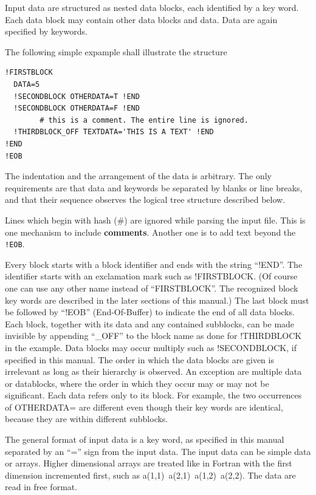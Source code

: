 \documentclass[final,12pt]{article}
\begin{document}
Input data are structured as nested data blocks, each identified
by a key word. Each data block may contain other data blocks and
data. Data are again specified by keywords.

The following simple expample shall illustrate the structure 
\begin{verbatim}
!FIRSTBLOCK
  DATA=5
  !SECONDBLOCK OTHERDATA=T !END
  !SECONDBLOCK OTHERDATA=F !END
        # this is a comment. The entire line is ignored.
  !THIRDBLOCK_OFF TEXTDATA='THIS IS A TEXT' !END
!END
!EOB
\end{verbatim}
The indentation and the arrangement of the data is arbitrary. The only
requirements are that data and keywords be separated by blanks or
line breaks, and that their sequence observes the logical tree structure
described below.

Lines which begin with hash ($\#$) are ignored while parsing the input
file. This is one mechanism to include
\textbf{comments}. Another one is to add
text beyond the \verb|!EOB|.

Every block starts with a block identifier and ends with the string
``!END''.  The identifier starts with an exclamation mark such as
!FIRSTBLOCK. (Of course one can use any other name instead of
``FIRSTBLOCK''. The recognized block key words are described in the
later sections of this manual.) The last block must be followed by
``!EOB'' (End-Of-Buffer) to indicate the end of all data blocks. Each
block, together with its data and any contained subblocks, can be
made invisible by appending ``\_OFF'' to the block name as done for
!THIRDBLOCK in the example. Data blocks may occur multiply such as
!SECONDBLOCK, if specified in this manual. The order in which the data
blocks are given is irrelevant as long as their hierarchy is observed.
An exception are multiple data or datablocks, where the order in
which they occur may or may not be significant.  Each data refers
only to its block. For example, the two occurrences of OTHERDATA=
are different even though their key words are identical, because they
are within different subblocks.

The general format of input data is a key word, as specified in this
manual separated by an ``='' sign from the input data.  The input data
can be simple data or arrays. Higher dimensional arrays are treated
like in Fortran with the first dimension incremented first, such as
a(1,1)\ a(2,1)\ a(1,2)\ a(2,2). The data are read in free format.
\end{document}
